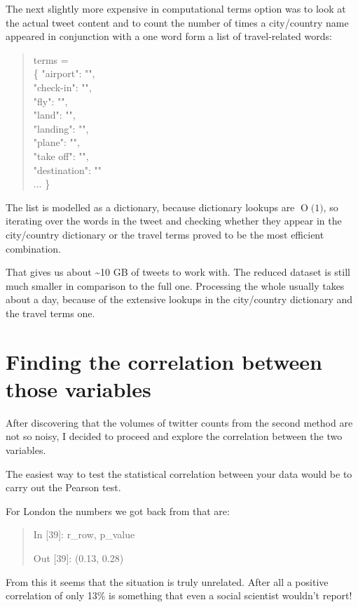 \documentclass[minf,frontabs,twoside,singlespacing,parskip]{infthesis}
\newcommand{\BigO}[1]{\ensuremath{\operatorname{O}\bigl(#1\bigr)}}
\begin{document}
The next slightly more expensive in computational terms option was to look at the actual tweet content and to count the number of times a city/country name appeared in conjunction with a one word form a list of travel-related words:

\begin{quotation}
terms = \\
\{ "airport": "", \\
"check-in": "", \\
"fly": "", \\
"land": "", \\ 
"landing": "", \\
"plane": "", \\ 
"take off": "", \\
"destination": "" \\
... \}
\end{quotation}

The list is modelled as a dictionary, because dictionary lookups are \BigO{1}, so iterating over the words in the tweet and checking whether they appear in the city/country dictionary or the travel terms proved to be the most efficient combination.

That gives us about  \textasciitilde  10 GB of tweets to work with. The reduced dataset is still much smaller in comparison to the full one. Processing the whole usually takes about a day, because of the extensive lookups in the city/country dictionary and the travel terms one.

\section{Finding the correlation between those variables}

After discovering that the volumes of twitter counts from the second method are not so noisy, I decided to proceed and explore the correlation between the two variables.

The easiest way to test the statistical correlation between your data would be to carry out the Pearson test.

For London the numbers we got back from that are:
\begin{quotation}
In [39]: r\_row, p\_value

Out [39]: (0.13, 0.28)
\end{quotation}

From this it seems that the situation is truly unrelated. After all a positive correlation of only 13\% is something that even a social scientist wouldn't report!
\end{document}
